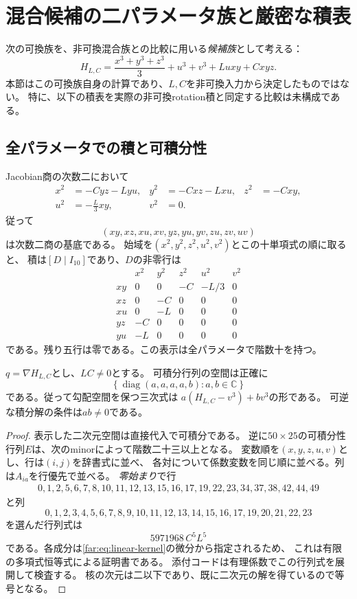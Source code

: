 \section{混合候補の二パラメータ族と厳密な積表}
\label{far:sec:mixed}

次の可換族を、非可換混合族との比較に用いる\emph{候補族}として考える：
\begin{equation}\label{far:eq:family}
 H_{L,C}=\frac{x^3+y^3+z^3}{3}+u^3+v^3+L uxy+C xyz.
\end{equation}
本節はこの可換族自身の計算であり、$L,C$を非可換入力から決定したものではない。
特に、以下の積表を実際の非可換rotation積と同定する比較は未構成である。

\subsection{全パラメータでの積と可積分性}

Jacobian商の次数二において
\begin{align*}
 x^2&=-Cyz-Lyu,& y^2&=-Cxz-Lxu,& z^2&=-Cxy,\\
 u^2&=-\tfrac L3xy,& v^2&=0.
\end{align*}
従って
\[
 (xy,xz,xu,xv,yz,yu,yv,zu,zv,uv)
\]
は次数二商の基底である。
始域を$(x^2,y^2,z^2,u^2,v^2)$とこの十単項式の順に取ると、
積は$[D\mid I_{10}]$であり、$D$の非零行は
\[
\begin{array}{c|rrrrr}
 &x^2&y^2&z^2&u^2&v^2\\\hline
xy&0&0&-C&-L/3&0\\
xz&0&-C&0&0&0\\
xu&0&-L&0&0&0\\
yz&-C&0&0&0&0\\
yu&-L&0&0&0&0
\end{array}
\]
である。残り五行は零である。この表示は全パラメータで階数十を持つ。

\begin{proposition}[混合領域の積分解空間]\label{far:prop:symmetrizer}
$q=\nabla H_{L,C}$とし、$LC\ne0$とする。
可積分行列の空間は正確に
\[
 \left\{\operatorname{diag}(a,a,a,a,b):a,b\in\mathbb C\right\}
\]
である。従って勾配空間を保つ三次式は
$a(H_{L,C}-v^3)+bv^3$の形である。
可逆な積分解の条件は$ab\ne0$である。
\end{proposition}
\begin{proof}
表示した二次元空間は直接代入で可積分である。
逆に$50\times25$の可積分性行列$E$は、次のminorによって階数二十三以上となる。
変数順を$(x,y,z,u,v)$とし、行は$(i,j)$を辞書式に並べ、
各対について係数変数を同じ順に並べる。列は$A_{ia}$を行優先で並べる。
\emph{零始まり}で行
\[
\begin{gathered}
0,1,2,5,6,7,8,10,11,12,13,15,16,17,19,22,23,34,37,38,42,44,49
\end{gathered}
\]
と列
\[
0,1,2,3,4,5,6,7,8,9,10,11,12,13,14,15,16,17,19,20,21,22,23
\]
を選んだ行列式は
\begin{equation}\label{far:eq:minor}
 5971968\,C^5L^5
\end{equation}
である。各成分は\eqref{far:eq:linear-kernel}の微分から指定されるため、
これは有限の多項式恒等式による証明書である。
添付コードは有理係数でこの行列式を展開して検査する。
核の次元は二以下であり、既に二次元の解を得ているので等号となる。
\end{proof}

